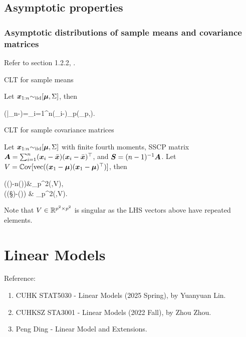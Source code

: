 \documentclass[10pt,a4paper]{book}
\begin{document}
\section{Asymptotic properties}\label{sec:asym_multi}
\subsection{Asymptotic distributions of sample means and covariance matrices}\label{sec:asym_multi_sampleMeanCov}
Refer to section 1.2.2, \cite{muirhead1982aspects}.
\begin{thmbox}{CLT for sample means}
	\begin{theorem}\label{thm:CLT_multi_sampleMean_iid}
		Let ${\boldsymbol x}_{1:n}{\sim}_{\mathrm{iid}}[{\boldsymbol\mu},\Sigma]$, then 
		\begin{sequation*}
			(\bar{\x}_n-\bam)=\sum_{i=1}^{n}(\x_i-\bam)\dto \rmN_p(\0_p,\Sigma). 
		\end{sequation*} 
	\end{theorem}
\end{thmbox}

\begin{thmbox}{CLT for sample covariance matrices}
	\begin{theorem}\label{thm:CLT_multi_sampleCov_iid}
		Let ${\boldsymbol x}_{1:n}{\sim}_{\mathrm{iid}}[{\boldsymbol\mu},\Sigma]$ with finite fourth moments, SSCP matrix ${\boldsymbol A}=\sum_{i=1}^{n}({\boldsymbol x}_i-\bar{{\boldsymbol x}})({\boldsymbol x}_i-\bar{{\boldsymbol x}})^\top$, and ${\boldsymbol S}=(n-1)^{-1}{\boldsymbol A}$. Let $V=\mathbb{C}\mathrm{ov}[{\mathrm{vec}}(({\boldsymbol x}_1-{\boldsymbol\mu})({\boldsymbol x}_1-{\boldsymbol\mu})^\top)]$, then 
		\begin{sequation*}
			\begin{aligned}
				(\vec(\A)-n\cdot\vec(\Sigma))&\dto \rmN_{p^2}(\0,V), \\
				(\vec(\S)-\vec(\Sigma)) & \dto \rmN_{p^2}(\0,V).
			\end{aligned}
		\end{sequation*}
	\end{theorem}
\end{thmbox}
Note that $V\in\mathbb R^{p^2\times p^2}$ is singular as the LHS vectors above have repeated elements. 


\chapter{Linear Models}\label{chap:linear_models}
Reference:
\begin{enumerate}
	\item CUHK STAT5030 - Linear Models (2025 Spring), by Yuanyuan Lin.
	\item CUHKSZ STA3001 - Linear Models (2022 Fall), by Zhou Zhou.
	\item Peng Ding - Linear Model and Extensions.
\end{enumerate}
\end{document}
